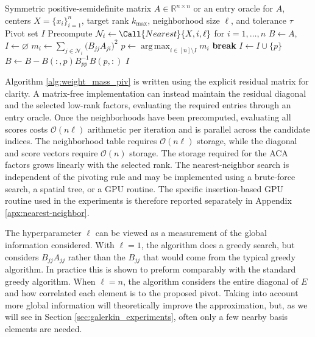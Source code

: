 \documentclass[11pt, preprint]{article}
\newcommand{\R}{\mathbb{R}}
\renewcommand{\O}{\mathcal{O}}
\newcommand{\algorithmicbreak}{\textbf{break}}
\begin{document}
\begin{algorithm}[t]
\caption{Weighted-mass diagonal ACA}\label{alg:weight_mass_piv}
\begin{algorithmic}[1]
\Require Symmetric positive-semidefinite matrix $A\in\R^{n\times n}$ or an
entry oracle for $A$, centers $X=\{x_i\}_{i=1}^n$, target rank $k_{\max}$,
neighborhood size $\ell$, and tolerance $\tau$
\Ensure Pivot set $I$
\State Precompute $\mathcal N_i\gets\Call{Nearest}{X,i,\ell}$ for
$i=1,\ldots,n$
\State $B\gets A$, $I\gets\varnothing$
        \State
        $m_i\gets\displaystyle
        \sum_{j\in\mathcal N_i}\bigl(B_{jj}A_{ji}\bigr)^2$
    \EndFor
    \State
    $p\gets\displaystyle
    \operatorname*{arg\,max}_{i\in[n]\setminus I}m_i$
        \State \algorithmicbreak
    \EndIf
    \State $I\gets I\cup\{p\}$
    \State $B\gets B-B(:,p)B_{pp}^{-1}B(p,:)$
\EndFor
\State \Return $I$
\end{algorithmic}
\end{algorithm}

Algorithm \ref{alg:weight_mass_piv} is written using the explicit residual
matrix for clarity. A matrix-free implementation can instead maintain the
residual diagonal and the selected low-rank factors, evaluating the required
entries through an entry oracle. Once the neighborhoods have been
precomputed, evaluating all scores costs $\O(n\ell)$ arithmetic per iteration
and is parallel across the candidate indices. The neighborhood table requires
$\O(n\ell)$ storage, while the diagonal and score vectors require $\O(n)$
storage. The storage required for the ACA factors grows linearly with the
selected rank. 
The nearest-neighbor search is independent of the pivoting rule and may be
implemented using a brute-force search, a spatial tree, or a GPU routine. The
specific insertion-based GPU routine used in the experiments is therefore
reported separately in Appendix \ref{apx:nearest-neighbor}.

The hyperparameter $\ell$ can be viewed as a measurement of the global information considered. With $\ell=1$, the algorithm does a greedy search, but considers $B_{jj}A_{jj}$ rather than the $B_{jj}$ that would come from the typical greedy algorithm. In practice this is shown to preform comparably with the standard greedy algorithm. When $\ell=n$, the algorithm considers the entire diagonal of $E$ and how correlated each element is to the proposed pivot. Taking into account more global information will theoretically improve the approximation, but, as we will see in Section \ref{sec:galerkin_experiments}, often only a few nearby basis elements are needed. 
\end{document}

